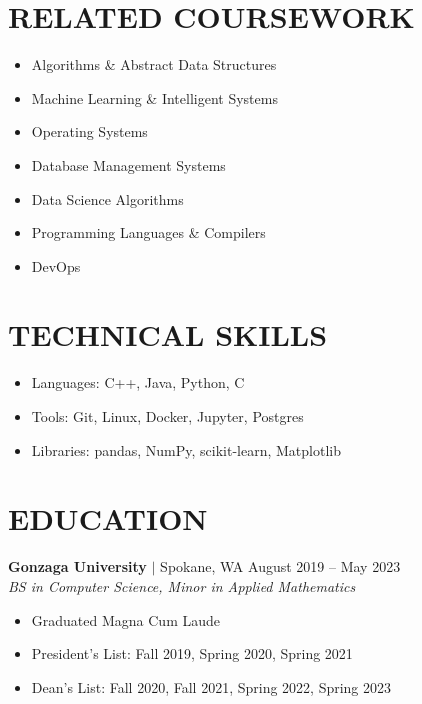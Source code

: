 \documentclass[11pt, a4paper, roman]{moderncv}
\newcommand{\education}[5]{
	\textbf{#1} $|$ #2
	\hfill#3
	\\\textit{#4}
	#5
	\vspace{2mm}
}
\begin{document}
\maketitle
\vspace*{-12mm}

\begin{multicols}{2}

\section{RELATED COURSEWORK}
{\begin{itemize}
    \item Algorithms \& Abstract Data Structures
    \item Machine Learning \& Intelligent Systems
    \item Operating Systems
    \item Database Management Systems
    \item Data Science Algorithms
    \item Programming Languages \& Compilers
    \item DevOps
  \end{itemize}
}

\columnbreak

\section{TECHNICAL SKILLS}
{\begin{itemize}
    \item Languages: C++, Java, Python, C
    \item Tools: Git, Linux, Docker, Jupyter, Postgres
    \item Libraries: pandas, NumPy, scikit-learn, Matplotlib
  \end{itemize}
}
\end{multicols}
\vspace*{-4mm}
\section{EDUCATION}

\education{Gonzaga University}{Spokane, WA}{August 2019 -- May 2023}{BS in Computer Science, Minor in Applied Mathematics}
	{\begin{itemize}
		\item Graduated Magna Cum Laude
    		\item President's List: Fall 2019, Spring 2020, Spring 2021
    		\item Dean's List: Fall 2020, Fall 2021, Spring 2022, Spring 2023
  	\end{itemize}
}
\end{document}
